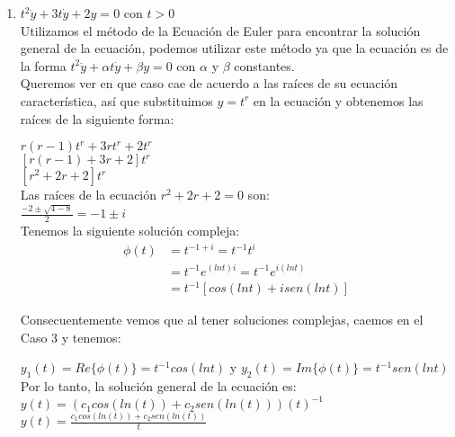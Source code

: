 \documentclass{article}
\begin{document}
\begin{enumerate}
{        }
        \item {
        	$t^2 \ddot y+ 3t \dot y + 2y =0$ con $t > 0$ \\
        	
        	\color{azul}
        	Utilizamos el método de la Ecuación de Euler para encontrar la solución general de la ecuación, podemos utilizar este método ya que la ecuación es de la forma $t^2\ddot{y} + \alpha t \dot{y} + \beta y = 0$ con $\alpha$ y $\beta$ constantes.\\
        	
        	Queremos ver en que caso cae de acuerdo a las raíces de su ecuación característica, así que substituimos $y = t^r$ en la ecuación y obtenemos las raíces de la siguiente forma:
        	
        	$r(r -1)t^r + 3rt^r + 2t^r$\\
        	$[r(r-1) + 3r + 2] t^r$\\
        	$[r^2 + 2r + 2] t^r$\\
        	Las raíces de la ecuación $r^2 + 2r + 2 = 0$ son:\\
        	$\frac{-2 \pm \sqrt{4 - 8}}{2} = -1\pm i$\\
        	
        	Tenemos la siguiente solución compleja:\\
        	
        	\begin{align*}
        	\phi(t) &= t^{-1 + i} = t^{-1}t^{i}\\
        	&= t^{-1}e^{(lnt)i} = t^{-1}e^{i(lnt)}\\
        	&= t^{-1}[cos(lnt) + isen(lnt)]
        	\end{align*}
        	
        	Consecuentemente vemos que al tener soluciones complejas, caemos en el Caso 3 y tenemos:
        	
        	$y_1(t) = Re\{\phi(t)\} = t^{-1}cos(lnt) $ y 
        	$y_2(t) = Im\{\phi(t)\} = t^{-1}sen(lnt) $\\
        	
        	
        	Por lo tanto, la solución general de la ecuación es:\\
        	
        	$y(t) = (c_1cos(ln(t)) + c_2 sen(ln(t)))(t)^{-1} $ \\
        	
        	$y(t) = \frac{c_1cos(ln(t)) + c_2 sen(ln(t))}{t} $\\
        	
}
\end{enumerate}
\end{document}
